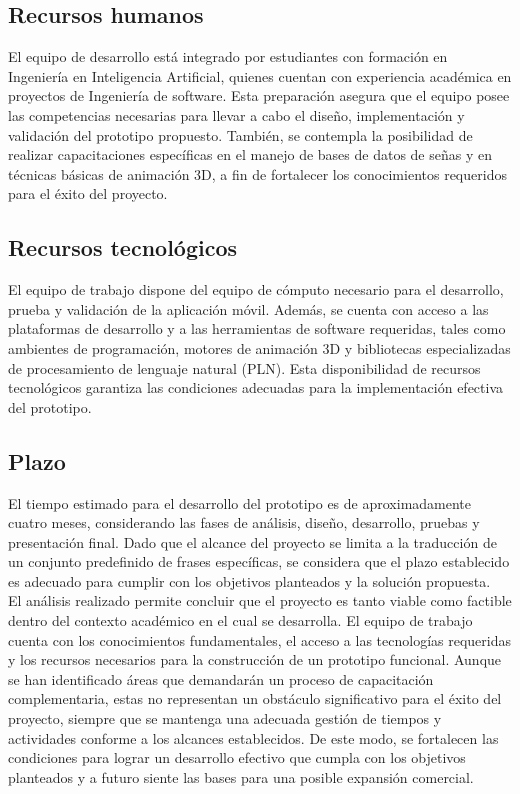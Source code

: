 \subsection{Recursos humanos}
El equipo de desarrollo está integrado por estudiantes con formación en Ingeniería en Inteligencia Artificial, quienes cuentan con experiencia académica en proyectos de Ingeniería de software. Esta preparación asegura que el equipo posee las competencias necesarias para llevar a cabo el diseño, implementación y validación del prototipo propuesto. También, se contempla la posibilidad de realizar capacitaciones específicas en el manejo de bases de datos de señas y en técnicas básicas de animación 3D, a fin de fortalecer los conocimientos requeridos para el éxito del proyecto.

\subsection{Recursos tecnológicos}
El equipo de trabajo dispone del equipo de cómputo necesario para el desarrollo, prueba y validación de la aplicación móvil. Además, se cuenta con acceso a las plataformas de desarrollo y a las herramientas de software requeridas, tales como ambientes de programación, motores de animación 3D y bibliotecas especializadas de procesamiento de lenguaje natural (PLN). Esta disponibilidad de recursos tecnológicos garantiza las condiciones adecuadas para la implementación efectiva del prototipo.

\subsection{Plazo}
El tiempo estimado para el desarrollo del prototipo es de aproximadamente cuatro meses, considerando las fases de análisis, diseño, desarrollo, pruebas y presentación final. Dado que el alcance del proyecto se limita a la traducción de un conjunto predefinido de frases específicas, se considera que el plazo establecido es adecuado para cumplir con los objetivos planteados y la solución propuesta. \\


El análisis realizado permite concluir que el proyecto es tanto viable como factible dentro del contexto académico en el cual se desarrolla. El equipo de trabajo cuenta con los conocimientos fundamentales, el acceso a las tecnologías requeridas y los recursos necesarios para la construcción de un prototipo funcional. Aunque se han identificado áreas que demandarán un proceso de capacitación complementaria, estas no representan un obstáculo significativo para el éxito del proyecto, siempre que se mantenga una adecuada gestión de tiempos y actividades conforme a los alcances establecidos. De este modo, se fortalecen las condiciones para lograr un desarrollo efectivo que cumpla con los objetivos planteados y a futuro siente las bases para una posible expansión comercial.
